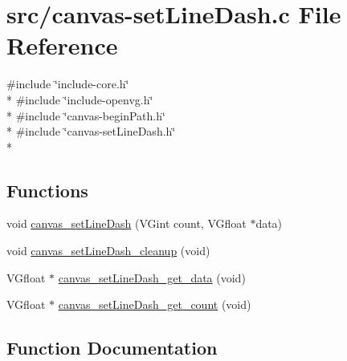 \hypertarget{canvas-setLineDash_8c}{}\section{src/canvas-\/set\+Line\+Dash.c File Reference}
\label{canvas-setLineDash_8c}
{\ttfamily \#include \char`\"{}include-\/core.\+h\char`\"{}}\\*
{\ttfamily \#include \char`\"{}include-\/openvg.\+h\char`\"{}}\\*
{\ttfamily \#include \char`\"{}canvas-\/begin\+Path.\+h\char`\"{}}\\*
{\ttfamily \#include \char`\"{}canvas-\/set\+Line\+Dash.\+h\char`\"{}}\\*
\subsection*{Functions}
\begin{DoxyCompactItemize}
\item 
void \hyperlink{canvas-setLineDash_8c_ad9a61343ebe550729606465767eadf8f}{canvas\+\_\+set\+Line\+Dash} (V\+Gint count, V\+Gfloat $\ast$data)
\item 
void \hyperlink{canvas-setLineDash_8c_ae54e972b2cf53e6178968d2b25a56d07}{canvas\+\_\+set\+Line\+Dash\+\_\+cleanup} (void)
\item 
V\+Gfloat $\ast$ \hyperlink{canvas-setLineDash_8c_af5a4ac39592594db4dc40f11c9ec3f9d}{canvas\+\_\+set\+Line\+Dash\+\_\+get\+\_\+data} (void)
\item 
V\+Gfloat $\ast$ \hyperlink{canvas-setLineDash_8c_a1426b7a10eed35919f7ac179dc3be118}{canvas\+\_\+set\+Line\+Dash\+\_\+get\+\_\+count} (void)
\end{DoxyCompactItemize}


\subsection{Function Documentation}
\hypertarget{canvas-setLineDash_8c_ad9a61343ebe550729606465767eadf8f}{}
